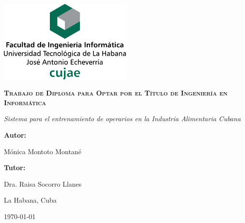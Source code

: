 \begin{titlepage}

\centering

{\includegraphics[width=0.5\textwidth]{imagen/cujae}\par}

\vspace{4cm}

{\bfseries\scshape\Large Trabajo de Diploma para Optar por el Título de Ingeniería en Informática\par}
\vspace{1cm}

{\itshape\Large Sistema para el entrenamiento de operarios en la Industria Alimentaria Cubana \par}
\vspace{4cm}

{\bfseries\Large Autor:} { \Large Mónica Montoto Montané \par}
{\bfseries\Large Tutor: }{\Large Dra. Raisa Socorro Llanes \par}
\vfill

{\Large La Habana, Cuba \par}

\small{\mifecha\today}

\end{titlepage}


